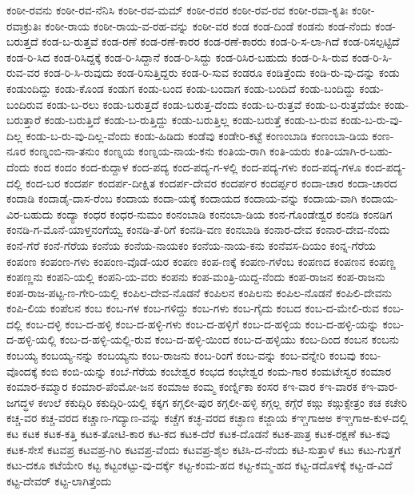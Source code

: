 ಕಂಠೀ-ರವನು
ಕಂಠೀ-ರವ-ನೆನಿಸಿ
ಕಂಠೀ-ರವ-ಮಮ್
ಕಂಠೀ-ರವರ
ಕಂಠೀ-ರವ-ರವ
ಕಂಠೀ-ರವಾ-ಕೃತಿಃ
ಕಂಠೀ-ರವಾಕ್ರುತಿಃ
ಕಂಠೀ-ರಾಯ
ಕಂಠೀ-ರಾಯ-ವ-ರಹ-ವನ್ನು
ಕಂಠೀ-ವರ
ಕಂಡ
ಕಂಡ-ದಿಂಡೆ
ಕಂಡನು
ಕಂಡ-ನೆಂದು
ಕಂಡ-ಬರುತ್ತದೆ
ಕಂಡ-ಬ-ರುತ್ತವೆ
ಕಂಡ-ರಣೆ
ಕಂಡ-ರಣೆ-ಕಾರರ
ಕಂಡ-ರಣೆ-ಕಾರರು
ಕಂಡ-ರಿ-ಸ-ಲಾ-ಗಿದೆ
ಕಂಡ-ರಿಸಲ್ಪಟ್ಟಿದೆ
ಕಂಡ-ರಿ-ಸಿದ
ಕಂಡ-ರಿಸಿದ್ದಕ್ಕೆ
ಕಂಡ-ರಿ-ಸಿದ್ದಾನೆ
ಕಂಡ-ರಿ-ಸಿದ್ದು
ಕಂಡ-ರಿಸಿರ-ಬಹುದು
ಕಂಡ-ರಿ-ಸಿ-ರುವ
ಕಂಡ-ರಿ-ಸಿ-ರುವ-ವರ
ಕಂಡ-ರಿ-ಸಿ-ರುವುದು
ಕಂಡ-ರಿಸುತ್ತಿದ್ದರು
ಕಂಡ-ರಿ-ಸುವ
ಕಂಡರೂ
ಕಂಡಿತ್ತೆಂದು
ಕಂಡಿ-ರು-ವು-ದನ್ನು
ಕಂಡು
ಕಂಡುಂದಿದ್ದು
ಕಂಡು-ಕೊಂಡ
ಕಂಡುಗ
ಕಂಡು-ಬಂದ
ಕಂಡು-ಬಂದಾಗ
ಕಂಡು-ಬಂದಿದೆ
ಕಂಡು-ಬಂದಿದ್ದು
ಕಂಡು-ಬಂದಿರುವ
ಕಂಡು-ಬ-ರಲು
ಕಂಡು-ಬರುತ್ತದೆ
ಕಂಡು-ಬರುತ್ತ-ದೆಂದು
ಕಂಡು-ಬ-ರುತ್ತವೆ
ಕಂಡು-ಬ-ರುತ್ತವೆಯೇ
ಕಂಡು-ಬರುತ್ತಾರೆ
ಕಂಡು-ಬರುತ್ತಿದೆ
ಕಂಡು-ಬ-ರುತ್ತಿದ್ದು
ಕಂಡು-ಬರುತ್ತಿಲ್ಲ
ಕಂಡು-ಬರುತ್ತೆ
ಕಂಡು-ಬ-ರುವ
ಕಂಡು-ಬ-ರು-ವು-ದಿಲ್ಲ
ಕಂಡು-ಬ-ರು-ವು-ದಿಲ್ಲ-ವೆಂದು
ಕಂಡು-ಹಿಡಿದು
ಕಂಡೆವು
ಕಂಡೇರಿ-ಕಟ್ಟೆ
ಕಂಣಂಬಾಡಿ
ಕಂಣಂಬಾ-ಡಿಯ
ಕಂಣ-ನೂರ
ಕಂಣ್ನಂಬಿ-ನಾ-ತನುಂ
ಕಂಣ್ನಯ
ಕಂಣ್ನಯ-ನಾಯ-ಕನು
ಕಂತಿಯ-ರಾಗಿ
ಕಂತಿ-ಯರು
ಕಂತಿ-ಯಾಗಿ-ರ-ಬಹು-ದೆಂದು
ಕಂದ
ಕಂದಂ
ಕಂದ-ಕುದ್ದಾಳ
ಕಂದ-ಪದ್ಯ
ಕಂದ-ಪದ್ಯ-ಗ-ಳಲ್ಲಿ
ಕಂದ-ಪದ್ಯ-ಗಳು
ಕಂದ-ಪದ್ಯ-ಗಳೂ
ಕಂದ-ಪದ್ಯ-ದಲ್ಲಿ
ಕಂದ-ಬರ
ಕಂದರ್ಪ
ಕಂದರ್ಪ-ದೀಕ್ಷಿತ
ಕಂದರ್ಪ-ದೇವರ
ಕಂದರ್ಪರ
ಕಂದರ್ಪ್ಪರ
ಕಂದಾ-ಚಾರ
ಕಂದಾ-ಚಾರದ
ಕಂದಾಡಿ
ಕಂದಾಡೈ-ದಾಸ-ರೆಂಬ
ಕಂದಾಯ
ಕಂದಾ-ಯಕ್ಕೆ
ಕಂದಾಯದ
ಕಂದಾಯ-ವನ್ನು
ಕಂದಾಯ-ವಾಗಿ
ಕಂದಾಯ-ವಿರ-ಬಹುದು
ಕಂದ್ಯಾ
ಕಂಧರ
ಕಂಧರ-ನುಮಂ
ಕಂನಂಬಾಡಿ
ಕಂನಂಬಾ-ಡಿಯ
ಕಂನ-ಗೊಂಡೇಶ್ವರ
ಕಂನಡಿ
ಕಂನಡಿಗ
ಕಂನಡಿ-ಗ-ಮೊನೆ-ಯಾಳ್ತನಂಗೆಯ್ವ
ಕಂನಡಿ-ತೆ-ರಿಗೆ
ಕಂನಡಿ-ವಣ
ಕಂನಬಾಡಿ
ಕಂನಾರ-ದೇವ
ಕಂನಾರ-ದೇವ-ನೆಂದು
ಕಂನೆ-ಗೆರೆ
ಕಂನೆ-ಗೆರೆಯ
ಕಂನೆಯ
ಕಂನೆಯ-ನಾಯಕಂ
ಕಂನೆಯ-ನಾಯ-ಕನು
ಕಂನೆವಸ-ದಿಯಂ
ಕಂನ್ನ-ಗೆರೆಯ
ಕಂಪಂಣ
ಕಂಪಂಣ-ಗಳು
ಕಂಪಂಣ-ವೊಡೆ-ಯರ
ಕಂಪಣ
ಕಂಪ-ಣಕ್ಕೆ
ಕಂಪಣ-ಗಳೆಂಬ
ಕಂಪಣದ
ಕಂಪಣನ
ಕಂಪಣ್ಣ
ಕಂಪಣ್ಣನು
ಕಂಪನಿ-ಯಲ್ಲಿ
ಕಂಪನಿ-ಯ-ವರು
ಕಂಪನು
ಕಂಪ-ಮಂತ್ರಿ-ಯಿದ್ದ-ನೆಂದು
ಕಂಪ-ರಾಜನ
ಕಂಪ-ರಾಜನು
ಕಂಪ-ರಾಜ-ಪಟ್ಟ-ಣ-ಗೇರಿ-ಯಲ್ಲಿ
ಕಂಪಿಲ-ದೇವ-ನೊಡನೆ
ಕಂಪಿಲನ
ಕಂಪಿಲನು
ಕಂಪಿಲ-ನೊಡನೆ
ಕಂಪಿಲಿ-ದೇವನು
ಕಂಪಿ-ಲಿಯ
ಕಂಪೆಲನ
ಕಂಬ
ಕಂಬ-ಗಳ
ಕಂಬ-ಗಳಿದ್ದು
ಕಂಬ-ಗಳು
ಕಂಬ-ಗೈದು
ಕಂಬದ
ಕಂಬ-ದ-ಮೇಲಿ-ರುವ
ಕಂಬ-ದಲ್ಲಿ
ಕಂಬ-ದಳ್ಳಿ
ಕಂಬ-ದ-ಹಳ್ಳಿ
ಕಂಬ-ದ-ಹಳ್ಳಿ-ಗಳು
ಕಂಬ-ದ-ಹಳ್ಳಿಗೆ
ಕಂಬ-ದ-ಹಳ್ಳಿಯ
ಕಂಬ-ದ-ಹಳ್ಳಿ-ಯನ್ನು
ಕಂಬ-ದ-ಹಳ್ಳಿ-ಯಲ್ಲಿ
ಕಂಬ-ದ-ಹಳ್ಳಿ-ಯಲ್ಲಿ-ರುವ
ಕಂಬ-ದ-ಹಳ್ಳಿ-ಯಿಂದ
ಕಂಬ-ದ-ಹಳ್ಳಿಯು
ಕಂಬ-ದಿಂದ
ಕಂಬನ
ಕಂಬನು
ಕಂಬಯ್ಯ
ಕಂಬಯ್ಯ-ನನ್ನು
ಕಂಬಯ್ಯನು
ಕಂಬ-ರಾಜನು
ಕಂಬ-ರಿಂಗೆ
ಕಂಬ-ವನ್ನು
ಕಂಬ-ವನ್ನೇರಿ
ಕಂಬವು
ಕಂಬ-ವೊಂದಕ್ಕೆ
ಕಂಬಿ
ಕಂಬಿ-ಯನ್ನು
ಕಂಬೆ-ಗೆರೆಯ
ಕಂಬೇಶ್ವರ
ಕಂಭದ
ಕಂಭೇಶ್ವರ
ಕಂಮ-ಗಾರ
ಕಂಮಟೇಸ್ವರ
ಕಂಮಾರ
ಕಂಮಾರ-ಕಮ್ಮಾರ
ಕಂಮಾರ-ಪೆಂಮೋ-ಜನ
ಕಂಮಾಱ
ಕಂಮ್ಮ
ಕಂರ್ಣ್ನಿಕಾ
ಕಂಸರ
ಕಇ-ವಾರ
ಕಇ-ವಾರಕ
ಕಇ-ವಾರ-ಜಗದ್ಧಳ
ಕಉಲೆ
ಕಕುದ್ಗಿರಿ
ಕಕುದ್ಗಿರಿ-ಯಲ್ಲಿ
ಕಕ್ಕಗ
ಕಗ್ಗಲೀ-ಪುರ
ಕಗ್ಗಲೀ-ಹಳ್ಳಿ
ಕಗ್ಗಲ್ಲ
ಕಗ್ಗೆರೆ
ಕಙ್ಗು
ಕಙ್ಗುಕ್ಸೇತ್ರಂ
ಕಚ
ಕಚೇರಿ
ಕಚ್ಚ-ವರ
ಕಚ್ಚ-ವರದ
ಕಚ್ಚಾಣ-ಗದ್ಯಾಣ-ವನ್ನು
ಕಚ್ಚೆಗ
ಕಚ್ಛ-ವರದ
ಕಚ್ಛಾಣ
ಕಜ್ಜಾಯ
ಕಞ್ಚಗಾಱಅ
ಕಞ್ಚಗಾಱ-ಕುಳ-ದಲ್ಲಿ
ಕಟ
ಕಟಕ
ಕಟಕ-ಕತ್ತಿ
ಕಟಕ-ತೋಟಿ-ಕಾರ
ಕಟ-ಕದ
ಕಟಕ-ದೆರೆ
ಕಟಕ-ದೊಡನೆ
ಕಟಕ-ಪಾತ್ರ
ಕಟಕ-ರಕ್ಷಣೆ
ಕಟ-ಕವು
ಕಟಕ-ಸೇಸೆ
ಕಟವಪ್ರ
ಕಟವಪ್ರ-ಗಿರಿ
ಕಟವಪ್ರ-ವೆಂದು
ಕಟವಪ್ರ-ಶೈಲ
ಕಟಿಸಿ-ದ-ನೆಂದು
ಕಟಿ-ಸುತ್ತಾಳೆ
ಕಟು
ಕಟು-ಗುತ್ತಗೆ
ಕಟು-ದಕೂ
ಕಟೆಯೇರಿ
ಕಟ್ಟ
ಕಟ್ಟಂಕಟ್ಟು-ವು-ದರ್ಕ್ಕೆ
ಕಟ್ಟ-ಕಂಮ-ಹದ
ಕಟ್ಟ-ಕಮ್ಮ-ಹದ
ಕಟ್ಟ-ಡದೊಳಕ್ಕೆ
ಕಟ್ಟ-ಡ-ವಿದೆ
ಕಟ್ಟ-ದೇವರ್
ಕಟ್ಟ-ಲಾಗಿತ್ತೆಂದು
